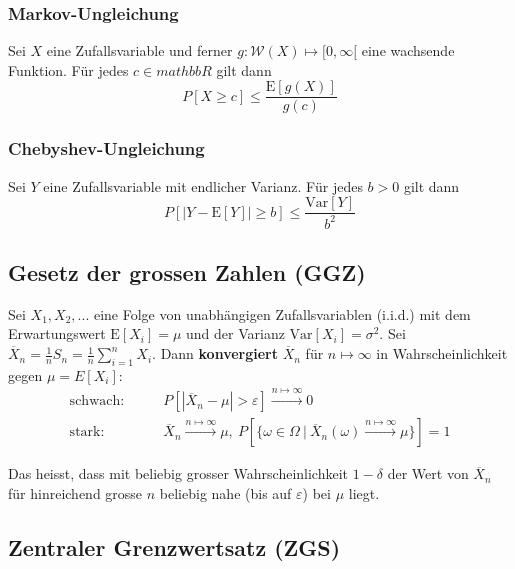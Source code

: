 \documentclass[11pt]{article}
\newcommand{\E}{\text{E}}
\newcommand{\Var}{\text{Var}}
\begin{document}
\subsubsection{Markov-Ungleichung}

Sei $X$ eine Zufallsvariable und ferner $g: \mathcal{W}(X) \mapsto [0, \infty[$ eine wachsende Funktion. F{\"u}r jedes $c \in mathbb{R}$ gilt dann
\begin{equation*}
	P[X \geq c] \leq \frac{\E[g(X)]}{g(c)}
\end{equation*}

\subsubsection{Chebyshev-Ungleichung}

Sei $Y$ eine Zufallsvariable mit endlicher Varianz. F{\"u}r jedes $b > 0$ gilt dann
\begin{equation*}
	P[|Y - \E[Y]| \geq b] \leq \frac{\Var[Y]}{b^2}
\end{equation*}

\subsection{Gesetz der grossen Zahlen (GGZ)}

Sei $X_1, X_2, ...$ eine Folge von unabh{\"a}ngigen Zufallsvariablen (i.i.d.) mit dem Erwartungswert $\E[X_i] = \mu$ und der Varianz $\Var[X_i] = \sigma^2$. Sei $\overline{X}_n = \frac{1}{n}S_n = \frac{1}{n}\sum_{i=1}^n X_i$. Dann \textbf{konvergiert} $\overline{X}_n$ f{\"u}r $n \mapsto \infty$ in Wahrscheinlichkeit gegen $\mu = E[X_i]$:
\begin{equation*}
\begin{split}
	\text{schwach:} & \qquad P[|\overline{X}_n - \mu| > \varepsilon] \xrightarrow{n \mapsto \infty} 0 \\
	\text{stark:} & \qquad \overline{X}_n \xrightarrow{n\mapsto\infty}\mu,\ P[\{\omega \in \Omega\ |\  \overline{X}_n(\omega) \xrightarrow{n\mapsto\infty}\mu\}] = 1 
\end{split}
\end{equation*}

Das heisst, dass mit beliebig grosser Wahrscheinlichkeit $1- \delta$ der Wert von $\overline{X}_n$ f{\"u}r hinreichend grosse $n$ beliebig nahe (bis auf $\varepsilon$) bei $\mu$ liegt.

\subsection{Zentraler Grenzwertsatz (ZGS)}
\end{document}

